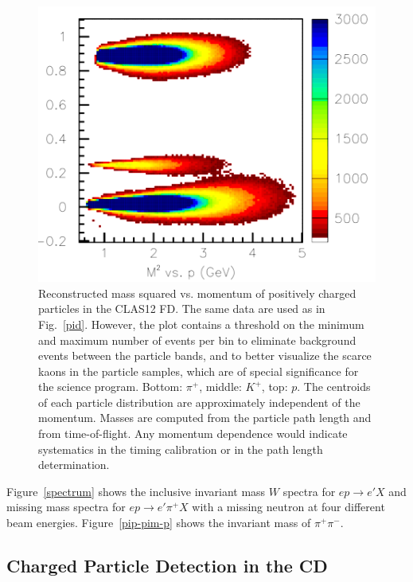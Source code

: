 \documentclass[final,3p,twocolumn]{elsarticle}
\begin{document}
\begin{figure}[hp!]
\centerline{\includegraphics[width=1.0\columnwidth]{FTOF1b_M2-vs-p.png}}
\caption{Reconstructed mass squared vs. momentum of positively charged particles in the CLAS12 FD. The same data
  are used as in Fig.~\ref{pid}. However, the plot contains a threshold on the minimum and maximum number of events per
  bin to eliminate background events between the particle bands, and to better visualize the scarce kaons in the particle
  samples, which are of special significance for the science program. Bottom: $\pi^+$, middle: $K^+$, top: $p$. The
  centroids of each particle distribution are approximately independent of the momentum. Masses are computed from
  the particle path length and from time-of-flight. Any momentum dependence would indicate systematics in the timing
  calibration or in the path length determination.}
\label{mass2-mom}
\end{figure} 

Figure~\ref{spectrum} shows the inclusive invariant mass $W$ spectra for $ep \to e' X$ and missing mass spectra
for $ep \to e' \pi^+ X$ with a missing neutron at four different beam energies. Figure~\ref{pip-pim-p} shows the
invariant mass of $\pi^+\pi^-$.

\subsection{Charged Particle Detection in the CD} 
\end{document}
